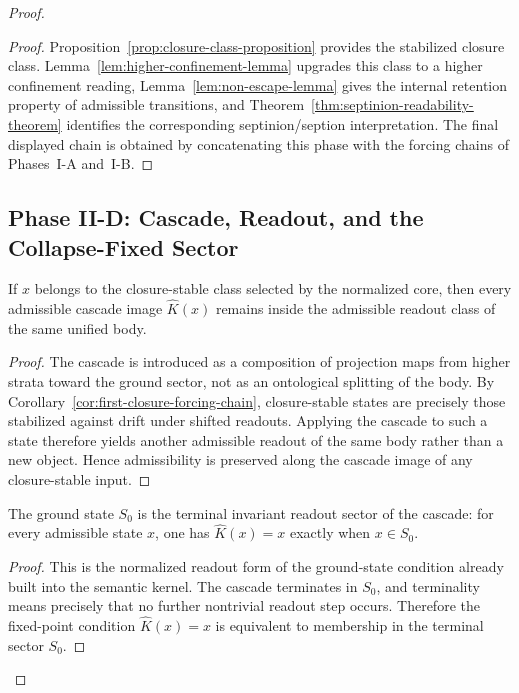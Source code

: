 \begin{proof}
\begin{proof}
Proposition~\ref{prop:closure-class-proposition} provides the stabilized
closure class. Lemma~\ref{lem:higher-confinement-lemma} upgrades this class to a
higher confinement reading, Lemma~\ref{lem:non-escape-lemma} gives the internal
retention property of admissible transitions, and
Theorem~\ref{thm:septinion-readability-theorem} identifies the corresponding
septinion/seption interpretation. The final displayed chain is obtained by
concatenating this phase with the forcing chains of Phases~I-A and~I-B.
\end{proof}


\subsection*{Phase II-D: Cascade, Readout, and the Collapse-Fixed Sector}

\begin{lemma}
\label{lem:cascade-admissibility-lemma}
If $x$ belongs to the closure-stable class selected by the normalized core,
then every admissible cascade image $\hat K(x)$ remains inside the admissible
readout class of the same unified body.
\end{lemma}

\begin{proof}
The cascade is introduced as a composition of projection maps from higher
strata toward the ground sector, not as an ontological splitting of the body.
By Corollary~\ref{cor:first-closure-forcing-chain}, closure-stable states are
precisely those stabilized against drift under shifted readouts. Applying the
cascade to such a state therefore yields another admissible readout of the same
body rather than a new object. Hence admissibility is preserved along the
cascade image of any closure-stable input.
\end{proof}

\begin{lemma}
\label{lem:terminal-ground-state-lemma}
The ground state $S_0$ is the terminal invariant readout sector of the cascade:
for every admissible state $x$, one has $\hat K(x)=x$ exactly when $x\in S_0$.
\end{lemma}

\begin{proof}
This is the normalized readout form of the ground-state condition already built
into the semantic kernel. The cascade terminates in $S_0$, and terminality
means precisely that no further nontrivial readout step occurs. Therefore the
fixed-point condition $\hat K(x)=x$ is equivalent to membership in the terminal
sector $S_0$.
\end{proof}


\end{proof}
